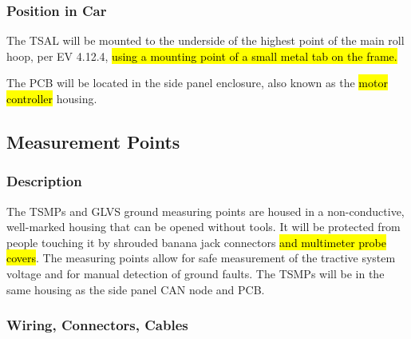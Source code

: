 \documentclass{article}
\DeclareRobustCommand{\hlr}[1]{{\sethlcolor{red}\hl{#1}}}
\begin{document}

        \subsubsection{Position in Car}

            The TSAL will be mounted to the underside of the highest point of the main roll hoop, per EV 4.12.4, \hlr{using a mounting point of a small metal tab on the frame. }

            The PCB will be located in the side panel enclosure, also known as the \hlr{motor controller} housing.

    \subsection{Measurement Points}

        \subsubsection{Description}


            The TSMPs and GLVS ground measuring points are housed in a non-conductive, well-marked housing that can be opened without tools. It will be protected from people touching it by shrouded banana jack connectors \hlr{and multimeter probe covers}. The measuring points allow for safe measurement of the tractive system voltage and for manual detection of ground faults. The TSMPs will be in the same housing as the side panel CAN node and PCB.

        \subsubsection{Wiring, Connectors, Cables}
\end{document}
